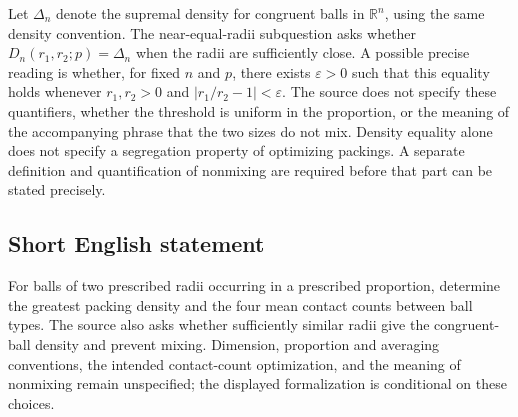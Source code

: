 \documentclass[11pt]{article}
\newcommand{\R}{\mathbb{R}}
\begin{document}
Let \(\Delta_n\) denote the supremal density for congruent balls in \(\R^n\), using the same density convention. The near-equal-radii subquestion asks whether \(D_n(r_1,r_2;p)=\Delta_n\) when the radii are sufficiently close. A possible precise reading is whether, for fixed \(n\) and \(p\), there exists \(\varepsilon>0\) such that this equality holds whenever \(r_1,r_2>0\) and \(\lvert r_1/r_2-1\rvert<\varepsilon\). The source does not specify these quantifiers, whether the threshold is uniform in the proportion, or the meaning of the accompanying phrase that the two sizes do not mix. Density equality alone does not specify a segregation property of optimizing packings. A separate definition and quantification of nonmixing are required before that part can be stated precisely.
\subsection{Short English statement}
For balls of two prescribed radii occurring in a prescribed proportion, determine the greatest packing density and the four mean contact counts between ball types. The source also asks whether sufficiently similar radii give the congruent-ball density and prevent mixing. Dimension, proportion and averaging conventions, the intended contact-count optimization, and the meaning of nonmixing remain unspecified; the displayed formalization is conditional on these choices.
\end{document}

